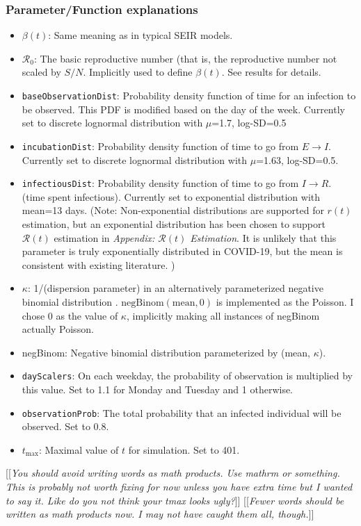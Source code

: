 \documentclass{article}
\newcommand{\nR}{\mathcal{R}}
\newcommand{\code}[1]{\texttt{#1}}
\newcommand{\jd}[1]{[[\textsl{#1}]]} %
\newcommand{\msComment}[1]{[[\textsl{#1}]]}
\begin{document}
\subsubsection{Parameter/Function explanations}
\begin{itemize}
    \item $\beta(t)$: Same meaning as in typical SEIR models. 
    \item $\nR_0$: The basic reproductive number (that is, the reproductive number not scaled by $S/N$. Implicitly used to define $\beta(t)$. See results for details.
    \item \code{baseObservationDist}: Probability density function of time for an infection to be observed. This PDF is modified based on the day of the week. Currently set to discrete lognormal distribution with $\mu$=1.7, log-SD=0.5 
    \item \code{incubationDist}: Probability density function of time to go from $E \rightarrow I$. Currently set to discrete lognormal distribution with $\mu$=1.63, log-SD=0.5. \cite{McAloon}
    \item \code{infectiousDist}: Probability density function of time to go from $I \rightarrow R$. (time spent infectious). Currently set to exponential distribution with mean=13 days. (Note: Non-exponential distributions are supported for $r(t)$ estimation, but an exponential distribution has been chosen to support $\nR(t)$ estimation in \emph{Appendix: $\nR(t)$ Estimation}. It is unlikely that this parameter is truly exponentially distributed in COVID-19, but the mean is consistent with existing literature. \cite{infectiousperiod})
    \item $\kappa$: 1/(dispersion parameter) in an alternatively parameterized negative binomial distribution \cite{NegBinom}. $\mathrm{negBinom}(\mathrm{mean}, 0)$ is implemented as the Poisson. I chose 0 as the value of $\kappa$, implicitly making all instances of negBinom actually Poisson.
    \item negBinom: Negative binomial distribution parameterized by (mean, $\kappa$). 
    \item \code{dayScalers}: On each weekday, the probability of observation is multiplied by this value. Set to 1.1 for Monday and Tuesday and 1 otherwise. 
    \item \code{observationProb}: The total probability that an infected individual will be observed. Set to 0.8.
    \item $t_{\mathrm{max}}$: Maximal value of $t$ for simulation. Set to 401.
\end{itemize}
\jd{You should avoid writing words as math products. Use mathrm or something. This is probably not worth fixing for now unless you have extra time but I wanted to say it. Like do you \emph{not} think your tmax looks ugly?} \msComment{Fewer words should be written as math products now. I may not have caught them all, though.}
\end{document}
